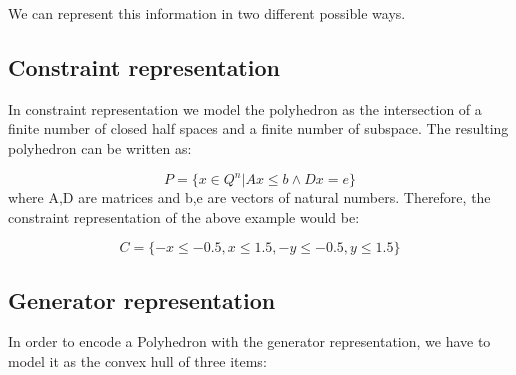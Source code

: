 \begin{center}
\end{center}
We can represent this information in two different possible ways.
\subsection{Constraint representation}
In constraint representation we model the polyhedron as the intersection of a finite number of closed half spaces and a finite number of subspace. The resulting polyhedron can be written as:

\begin{equation}
	P=\{x\in Q^n |Ax\leq b \wedge Dx=e\}
\end{equation}
where A,D are matrices and b,e are vectors of natural numbers. Therefore, the constraint representation of the above example would be:

\begin{equation}
	C = \{-x \leq -0.5,x\leq 1.5 , -y \leq -0.5 ,y\leq 1.5\}
\end{equation}

\subsection{Generator representation}
In order to encode a Polyhedron with the generator representation, we have to model it as the convex hull of three items: 

